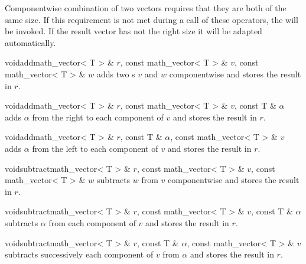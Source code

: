 Componentwise combination of two vectors requires that they are both of the same size.  If this
requirement is not met during a call of these operators, the \LEH will be invoked.  If the
result vector has not the right size it will be adapted automatically.




\begin{fcode}{void}{add}{math_vector< T > & $r$, const math_vector< T > & $v$, const math_vector< T > & $w$}
  adds two s $v$ and $w$ componentwise and stores the result in $r$.
\end{fcode}

\begin{fcode}{void}{add}{math_vector< T > & $r$, const math_vector< T > & $v$, const T & $\alpha$}
  adds $\alpha$ from the right to each component of  $v$ and stores the result
  in $r$.
\end{fcode}

\begin{fcode}{void}{add}{math_vector< T > & $r$, const T & $\alpha$, const math_vector< T > & $v$}
  adds $\alpha$ from the left to each component of  $v$ and stores the result
  in $r$.
\end{fcode}




\begin{fcode}{void}{subtract}{math_vector< T > & $r$, const math_vector< T > &  $v$,
    const math_vector< T > & $w$}%
  subtracts  $w$ from $v$ componentwise and stores the result in $r$.
\end{fcode}

\begin{fcode}{void}{subtract}{math_vector< T > & $r$, const math_vector< T > & $v$, const T & $\alpha$}
  subtracts $\alpha$ from each component of  $v$ and stores the result in $r$.
\end{fcode}

\begin{fcode}{void}{subtract}{math_vector< T > & $r$, const T & $\alpha$, const math_vector< T > & $v$}
  subtracts successively each component of  $v$ from $\alpha$ and stores the
  result in $r$.
\end{fcode}


